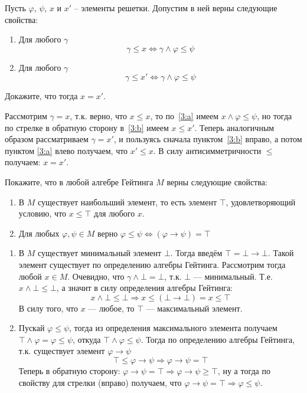 \begin{task}[3]
Пусть $\varphi$, $\psi$, $x$ и $x'$ -- элементы решетки. Допустим в ней верны следующие свойства:
	\begin{enumerate}
	\item \label{3:a} Для любого $\gamma$
	    \[ \gamma \leq x \Leftrightarrow \gamma \land \varphi \leq \psi \]
	\item \label{3:b} Для любого $\gamma$
	    \[ \gamma \leq x' \Leftrightarrow \gamma \land \varphi \leq \psi \]
	\end{enumerate}
Докажите, что тогда $x = x'$.
\end{task}
\begin{solution}
Рассмотрим $\gamma = x$, т.к. верно, что $x \leq x$, то по~\ref{3:a} имеем $x \land \varphi \leq \psi$, но тогда по стрелке в обратную сторону в~\ref{3:b} имеем $x \leq x'$. Теперь аналогичным образом рассматриваем $\gamma = x'$, и пользуясь сначала пунктом~\ref{3:b} вправо, а потом пунктом \ref{3:a} влево получаем, что $x' \leq x$. В силу антисимметричности $\leq$ получаем: $x = x'$. \xqed
\end{solution}

\begin{task}[4]
Покажите, что в любой алгебре Гейтинга $M$ верны следующие свойства:
	\begin{enumerate}
	\item В $M$ существует наибольший элемент, то есть элемент $\top$, удовлетворяющий условию, что $x \leq \top$ для любого $x$.
	\item Для любых $\varphi, \psi \in M$ верно $\varphi \leq \psi \Leftrightarrow (\varphi \to \psi) = \top$
	\end{enumerate}
\end{task}
\begin{solution}
\begin{enumerate}
\item В $M$ существует минимальный элемент $\bot$. Тогда введём $\top = \bot \rightarrow \bot$. Такой элемент существует по определению алгебры Гейтинга. Рассмотрим тогда любой $x \in M$. Очевидно, что $\gamma \land \bot = \bot$, т.к. $\bot$ --- минимальный. Т.е. $x \land \bot \leq \bot$, а значит в силу определения алгебры Гейтинга:
\[
	x \land \bot \leq \bot \Rightarrow x \leq (\bot \rightarrow \bot) = x \leq \top
\]
В силу того, что $x$ --- любое, то $\top$ --- максимальный элемент. \xqed
\item Пускай $\varphi \leq \psi$, тогда из определения максимального элемента получаем $\top \land \varphi = \varphi \leq \psi$, откуда ${\top \land \varphi \leq \psi}$. Тогда по определению алгебры Гейтинга, т.к. существует элемент $\varphi \rightarrow \psi$
\[
	\top \leq \varphi \rightarrow \psi \Rightarrow \varphi \rightarrow \psi = \top
\]
Теперь в обратную сторону: $\varphi \rightarrow \psi = \top \Rightarrow \varphi \rightarrow \psi \geq \top$, ну а тогда по свойству для стрелки (вправо) получаем, что $\varphi \rightarrow \psi = \top \Rightarrow \varphi \leq \psi$. \xqed
\end{enumerate}
\end{solution}

